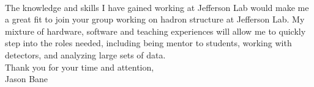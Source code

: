 \documentclass[12pt,letterpaper]{article}
\begin{document}
\paragraph{}The knowledge and skills I have gained working at Jefferson Lab would make me a great fit to join your group working on hadron structure at Jefferson Lab. My mixture of hardware, software and teaching experiences will allow me to quickly step into the roles needed, including being mentor to students, working with detectors, and analyzing large sets of data. 
\\

\noindent Thank you for your time and attention,\\
\noindent Jason Bane
\end{document}
